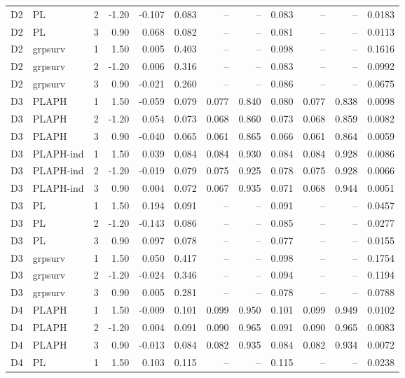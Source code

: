 \begin{longtable}{cllrrrrrrrrr}
D2 & PL & 2 & -1.20 & -0.107 & 0.083 & -- & -- & 0.083 & -- & -- & 0.0183 \\
D2 & PL & 3 & 0.90 & 0.068 & 0.082 & -- & -- & 0.081 & -- & -- & 0.0113 \\
D2 & grpsurv & 1 & 1.50 & 0.005 & 0.403 & -- & -- & 0.098 & -- & -- & 0.1616 \\
D2 & grpsurv & 2 & -1.20 & 0.006 & 0.316 & -- & -- & 0.083 & -- & -- & 0.0992 \\
D2 & grpsurv & 3 & 0.90 & -0.021 & 0.260 & -- & -- & 0.086 & -- & -- & 0.0675 \\
D3 & PLAPH & 1 & 1.50 & -0.059 & 0.079 & 0.077 & 0.840 & 0.080 & 0.077 & 0.838 & 0.0098 \\
D3 & PLAPH & 2 & -1.20 & 0.054 & 0.073 & 0.068 & 0.860 & 0.073 & 0.068 & 0.859 & 0.0082 \\
D3 & PLAPH & 3 & 0.90 & -0.040 & 0.065 & 0.061 & 0.865 & 0.066 & 0.061 & 0.864 & 0.0059 \\
D3 & PLAPH-ind & 1 & 1.50 & 0.039 & 0.084 & 0.084 & 0.930 & 0.084 & 0.084 & 0.928 & 0.0086 \\
D3 & PLAPH-ind & 2 & -1.20 & -0.019 & 0.079 & 0.075 & 0.925 & 0.078 & 0.075 & 0.928 & 0.0066 \\
D3 & PLAPH-ind & 3 & 0.90 & 0.004 & 0.072 & 0.067 & 0.935 & 0.071 & 0.068 & 0.944 & 0.0051 \\
D3 & PL & 1 & 1.50 & 0.194 & 0.091 & -- & -- & 0.091 & -- & -- & 0.0457 \\
D3 & PL & 2 & -1.20 & -0.143 & 0.086 & -- & -- & 0.085 & -- & -- & 0.0277 \\
D3 & PL & 3 & 0.90 & 0.097 & 0.078 & -- & -- & 0.077 & -- & -- & 0.0155 \\
D3 & grpsurv & 1 & 1.50 & 0.050 & 0.417 & -- & -- & 0.098 & -- & -- & 0.1754 \\
D3 & grpsurv & 2 & -1.20 & -0.024 & 0.346 & -- & -- & 0.094 & -- & -- & 0.1194 \\
D3 & grpsurv & 3 & 0.90 & 0.005 & 0.281 & -- & -- & 0.078 & -- & -- & 0.0788 \\
D4 & PLAPH & 1 & 1.50 & -0.009 & 0.101 & 0.099 & 0.950 & 0.101 & 0.099 & 0.949 & 0.0102 \\
D4 & PLAPH & 2 & -1.20 & 0.004 & 0.091 & 0.090 & 0.965 & 0.091 & 0.090 & 0.965 & 0.0083 \\
D4 & PLAPH & 3 & 0.90 & -0.013 & 0.084 & 0.082 & 0.935 & 0.084 & 0.082 & 0.934 & 0.0072 \\
D4 & PL & 1 & 1.50 & 0.103 & 0.115 & -- & -- & 0.115 & -- & -- & 0.0238 \\

\end{longtable}
